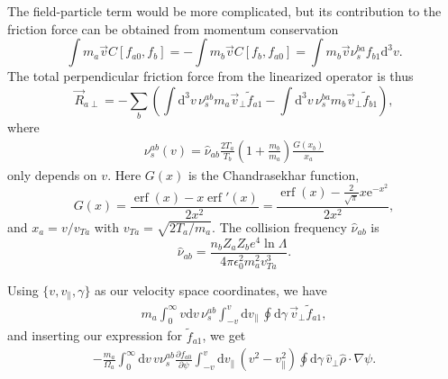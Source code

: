 \documentclass[12pt, a4paper]{article}
\DeclareMathOperator\erf{erf}
\newcommand{\e}{\ensuremath{\mathrm{e}}}
\newcommand{\p}{\ensuremath{\partial}}
\renewcommand{\d}{\ensuremath{\mathrm{d}}}
\begin{document}
The field-particle term would be more complicated, but its contribution to the friction force can be obtained from momentum conservation
\begin{equation}
\int m_a \vec{v} C[f_{a0},f_{b}] = -\int m_b \vec{v} C[f_{b},f_{a0}] = \int m_b \vec{v} \nu_s^{ba} f_{b1} \d^3 v.
\end{equation}
The total perpendicular friction force from the linearized operator is thus
\begin{equation}
  \vec{R}_{a\perp} = -\sum_b \left( \int  \d^3 v \, \nu_s^{ab} m_a \vec{v}_\perp \tilde{f}_{a1} - \int  \d^3 v\, \nu_s^{ba}m_b  \vec{v}_\perp  \tilde{f}_{b1} \right),
\end{equation}
where
\begin{align}
  \nu_s^{ab}(v) = \hat{\nu}_{ab} \frac{2 T_a}{T_b} \left(1 + \frac{m_b}{m_a} \right) \frac{G(x_b)}{x_a}
\end{align}
only depends on $v$. Here $G(x)$ is the Chandrasekhar function,
\begin{equation}
G(x) = \frac{\erf{(x)}  - x \erf'{(x)}}{2x^2} = \frac{\erf{(x)}  - \frac{2}{\sqrt{\pi}}x \e^{-x^2}}{2x^2},
\end{equation}
and $x_a = v/v_{Ta}$ with $v_{Ta} = \sqrt{2T_a/m_a}$. The collision frequency $\hat{\nu}_{ab}$ is
\begin{equation}
\hat{\nu}_{ab} = \frac{n_b Z_a Z_b e^4 \ln \Lambda}{4\pi \epsilon_0^2 m_a^2 v_{Ta}^3}.
\end{equation}

Using $\{v,v_\|, \gamma\}$ as our velocity space coordinates, we have
\begin{align}
m_a \int_0^\infty v  \d v \, \nu_s^{ab} \int_{-v}^v \d v_\| \, \oint \d\gamma\,  \vec{v}_\perp \tilde{f}_{a1},
\end{align}
and inserting our expression for $\tilde{f}_{a1}$, we get
\begin{align}
-\frac{m_a}{\Omega_a} \int_0^\infty \d v \, v \nu_s^{ab} \frac{\p f_{a0}}{\p \psi} \int_{-v}^v \d v_\|\, (v^2 - v_\|^2) \oint \d\gamma\,   \hat{v}_\perp \hat{\rho} \cdot \nabla \psi.
\end{align}
\end{document}
